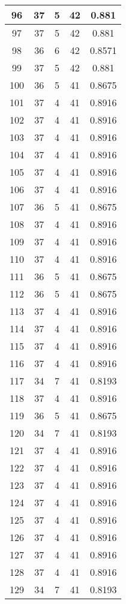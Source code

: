 \documentclass[letterpaper, 12pt]{article}
\begin{document}
\begin{longtable}{|c|c|c|c|c|}
\hline
96 & 37 & 5 & 42 & 0.881 \\
\hline
97 & 37 & 5 & 42 & 0.881 \\
\hline
98 & 36 & 6 & 42 & 0.8571 \\
\hline
99 & 37 & 5 & 42 & 0.881 \\
\hline
100 & 36 & 5 & 41 & 0.8675 \\
\hline
101 & 37 & 4 & 41 & 0.8916 \\
\hline
102 & 37 & 4 & 41 & 0.8916 \\
\hline
103 & 37 & 4 & 41 & 0.8916 \\
\hline
104 & 37 & 4 & 41 & 0.8916 \\
\hline
105 & 37 & 4 & 41 & 0.8916 \\
\hline
106 & 37 & 4 & 41 & 0.8916 \\
\hline
107 & 36 & 5 & 41 & 0.8675 \\
\hline
108 & 37 & 4 & 41 & 0.8916 \\
\hline
109 & 37 & 4 & 41 & 0.8916 \\
\hline
110 & 37 & 4 & 41 & 0.8916 \\
\hline
111 & 36 & 5 & 41 & 0.8675 \\
\hline
112 & 36 & 5 & 41 & 0.8675 \\
\hline
113 & 37 & 4 & 41 & 0.8916 \\
\hline
114 & 37 & 4 & 41 & 0.8916 \\
\hline
115 & 37 & 4 & 41 & 0.8916 \\
\hline
116 & 37 & 4 & 41 & 0.8916 \\
\hline
117 & 34 & 7 & 41 & 0.8193 \\
\hline
118 & 37 & 4 & 41 & 0.8916 \\
\hline
119 & 36 & 5 & 41 & 0.8675 \\
\hline
120 & 34 & 7 & 41 & 0.8193 \\
\hline
121 & 37 & 4 & 41 & 0.8916 \\
\hline
122 & 37 & 4 & 41 & 0.8916 \\
\hline
123 & 37 & 4 & 41 & 0.8916 \\
\hline
124 & 37 & 4 & 41 & 0.8916 \\
\hline
125 & 37 & 4 & 41 & 0.8916 \\
\hline
126 & 37 & 4 & 41 & 0.8916 \\
\hline
127 & 37 & 4 & 41 & 0.8916 \\
\hline
128 & 37 & 4 & 41 & 0.8916 \\
\hline
129 & 34 & 7 & 41 & 0.8193 \\

\end{longtable}
\end{document}
